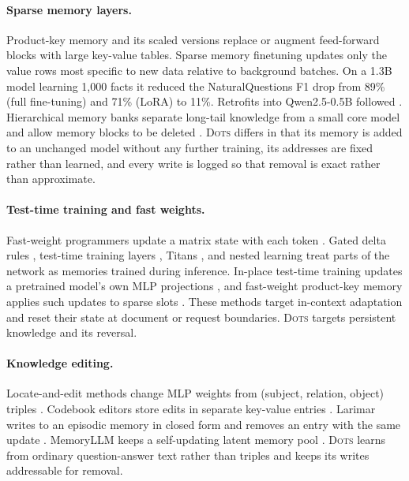 \documentclass[11pt]{article}
\newcommand{\sys}{\textsc{Dots}}
\begin{document}
\paragraph{Sparse memory layers.} Product-key memory \citep{lample2019pkm} and its scaled versions \citep{berges2024memory} replace or augment feed-forward blocks with large key-value tables. Sparse memory finetuning \citep{lin2025smf} updates only the value rows most specific to new data relative to background batches. On a 1.3B model learning 1{,}000 facts it reduced the NaturalQuestions F1 drop from 89\% (full fine-tuning) and 71\% (LoRA) to 11\%. Retrofits into Qwen2.5-0.5B followed \citep{goyal2026improving,gupta2026smf}. Hierarchical memory banks separate long-tail knowledge from a small core model and allow memory blocks to be deleted \citep{pouransari2026hier}. \sys{} differs in that its memory is added to an unchanged model without any further training, its addresses are fixed rather than learned, and every write is logged so that removal is exact rather than approximate.

\paragraph{Test-time training and fast weights.} Fast-weight programmers update a matrix state with each token \citep{schlag2021linear}. Gated delta rules \citep{yang2025gated}, test-time training layers \citep{sun2024ttt}, Titans \citep{behrouz2025titans}, and nested learning \citep{behrouz2025nested} treat parts of the network as memories trained during inference. In-place test-time training updates a pretrained model's own MLP projections \citep{feng2026inplace}, and fast-weight product-key memory applies such updates to sparse slots \citep{zhao2026fwpkm}. These methods target in-context adaptation and reset their state at document or request boundaries. \sys{} targets persistent knowledge and its reversal.

\paragraph{Knowledge editing.} Locate-and-edit methods change MLP weights from (subject, relation, object) triples \citep{meng2022rome,meng2023memit,fang2025alphaedit}. Codebook editors store edits in separate key-value entries \citep{hartvigsen2023grace,wang2024wise}. Larimar writes to an episodic memory in closed form and removes an entry with the same update \citep{das2024larimar}. MemoryLLM keeps a self-updating latent memory pool \citep{wang2024memoryllm}. \sys{} learns from ordinary question-answer text rather than triples and keeps its writes addressable for removal.
\end{document}
